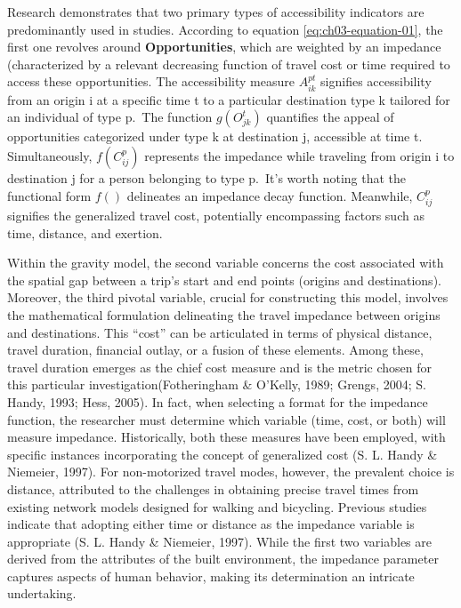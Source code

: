 \documentclass[
11pt, %
oneside, %
english, %
singlespacing, %
]{macthesis} %
\begin{document}
Research demonstrates that two primary types of accessibility indicators are predominantly used in studies. According to equation \ref{eq:ch03-equation-01}, the first one revolves around \textbf{Opportunities}, which are weighted by an impedance (characterized by a relevant decreasing function of travel cost or time required to access these opportunities. The accessibility measure \(A^ {pt}_{ik}\) signifies accessibility from an origin i at a specific time t to a particular destination type k tailored for an individual of type p.~The function \(g(O^t_{jk})\) quantifies the appeal of opportunities categorized under type k at destination j, accessible at time t. Simultaneously, \(f(C^p_{ij})\) represents the impedance while traveling from origin i to destination j for a person belonging to type p.~It's worth noting that the functional form \(f()\) delineates an impedance decay function. Meanwhile, \(C^p_{ij}\) signifies the generalized travel cost, potentially encompassing factors such as time, distance, and exertion.

Within the gravity model, the second variable concerns the cost associated with the spatial gap between a trip's start and end points (origins and destinations). Moreover, the third pivotal variable, crucial for constructing this model, involves the mathematical formulation delineating the travel impedance between origins and destinations. This ``cost'' can be articulated in terms of physical distance, travel duration, financial outlay, or a fusion of these elements. Among these, travel duration emerges as the chief cost measure and is the metric chosen for this particular investigation(Fotheringham \& O'Kelly, 1989; Grengs, 2004; S. Handy, 1993; Hess, 2005). In fact, when selecting a format for the impedance function, the researcher must determine which variable (time, cost, or both) will measure impedance. Historically, both these measures have been employed, with specific instances incorporating the concept of generalized cost (S. L. Handy \& Niemeier, 1997). For non-motorized travel modes, however, the prevalent choice is distance, attributed to the challenges in obtaining precise travel times from existing network models designed for walking and bicycling. Previous studies indicate that adopting either time or distance as the impedance variable is appropriate (S. L. Handy \& Niemeier, 1997). While the first two variables are derived from the attributes of the built environment, the impedance parameter captures aspects of human behavior, making its determination an intricate undertaking.
\end{document}
